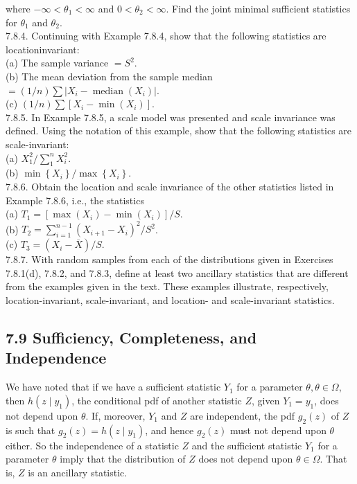 where $-\infty<\theta_{1}<\infty$ and $0<\theta_{2}<\infty$. Find the joint minimal sufficient statistics for $\theta_{1}$ and $\theta_{2}$.\\
7.8.4. Continuing with Example 7.8.4, show that the following statistics are locationinvariant:\\
(a) The sample variance $=S^{2}$.\\
(b) The mean deviation from the sample median $=(1 / n) \sum\left|X_{i}-\operatorname{median}\left(X_{i}\right)\right|$.\\
(c) $(1 / n) \sum\left[X_{i}-\min \left(X_{i}\right)\right]$.\\
7.8.5. In Example 7.8.5, a scale model was presented and scale invariance was defined. Using the notation of this example, show that the following statistics are scale-invariant:\\
(a) $X_{1}^{2} / \sum_{1}^{n} X_{i}^{2}$.\\
(b) $\min \left\{X_{i}\right\} / \max \left\{X_{i}\right\}$.\\
7.8.6. Obtain the location and scale invariance of the other statistics listed in Example 7.8.6, i.e., the statistics\\
(a) $T_{1}=\left[\max \left(X_{i}\right)-\min \left(X_{i}\right)\right] / S$.\\
(b) $T_{2}=\sum_{i=1}^{n-1}\left(X_{i+1}-X_{i}\right)^{2} / S^{2}$.\\
(c) $T_{3}=\left(X_{i}-\bar{X}\right) / S$.\\
7.8.7. With random samples from each of the distributions given in Exercises 7.8.1(d), 7.8.2, and 7.8.3, define at least two ancillary statistics that are different from the examples given in the text. These examples illustrate, respectively, location-invariant, scale-invariant, and location- and scale-invariant statistics.

\subsection*{7.9 Sufficiency, Completeness, and Independence}
We have noted that if we have a sufficient statistic $Y_{1}$ for a parameter $\theta, \theta \in \Omega$, then $h\left(z \mid y_{1}\right)$, the conditional pdf of another statistic $Z$, given $Y_{1}=y_{1}$, does not depend upon $\theta$. If, moreover, $Y_{1}$ and $Z$ are independent, the pdf $g_{2}(z)$ of $Z$ is such that $g_{2}(z)=h\left(z \mid y_{1}\right)$, and hence $g_{2}(z)$ must not depend upon $\theta$ either. So the independence of a statistic $Z$ and the sufficient statistic $Y_{1}$ for a parameter $\theta$ imply that the distribution of $Z$ does not depend upon $\theta \in \Omega$. That is, $Z$ is an ancillary statistic.


